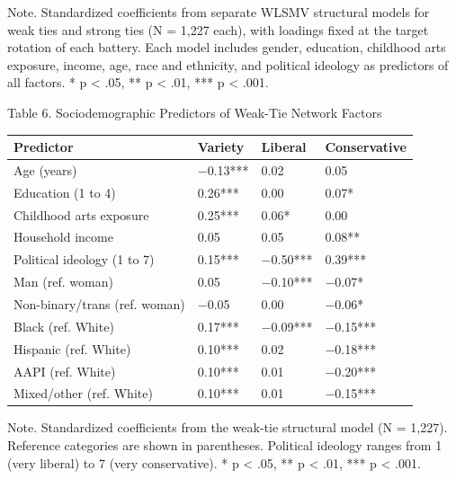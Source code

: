 \documentclass[
  12pt
]{article}
\begin{document}
Note. Standardized coefficients from separate WLSMV structural models for weak ties and strong ties (N = 1,227 each), with loadings fixed at the target rotation of each battery. Each model includes gender, education, childhood arts exposure, income, age, race and ethnicity, and political ideology as predictors of all factors. * p < .05, ** p < .01, *** p < .001.

Table 6. Sociodemographic Predictors of Weak-Tie Network Factors

\begin{tabular*}{\textwidth}{@{\extracolsep{\fill}}>{\raggedright\arraybackslash}p{} @{\hspace{1pt}}>{\raggedleft\arraybackslash}p{}@{\hspace{1pt}}>{\raggedleft\arraybackslash}p{}@{\hspace{1pt}}>{\raggedleft\arraybackslash}p{}@{}}
\toprule
Predictor & Variety & Liberal & Conservative \\
\midrule
Age (years) & $-$0.13*** & \hphantom{$-$}0.02 & \hphantom{$-$}0.05 \\
Education (1 to 4) & \hphantom{$-$}0.26*** & \hphantom{$-$}0.00 & \hphantom{$-$}0.07* \\
Childhood arts exposure & \hphantom{$-$}0.25*** & \hphantom{$-$}0.06* & \hphantom{$-$}0.00 \\
Household income & \hphantom{$-$}0.05 & \hphantom{$-$}0.05 & \hphantom{$-$}0.08** \\
Political ideology (1 to 7) & \hphantom{$-$}0.15*** & $-$0.50*** & \hphantom{$-$}0.39*** \\
Man (ref. woman) & \hphantom{$-$}0.05 & $-$0.10*** & $-$0.07* \\
Non-binary/trans (ref. woman) & $-$0.05 & \hphantom{$-$}0.00 & $-$0.06* \\
Black (ref. White) & \hphantom{$-$}0.17*** & $-$0.09*** & $-$0.15*** \\
Hispanic (ref. White) & \hphantom{$-$}0.10*** & \hphantom{$-$}0.02 & $-$0.18*** \\
AAPI (ref. White) & \hphantom{$-$}0.10*** & \hphantom{$-$}0.01 & $-$0.20*** \\
Mixed/other (ref. White) & \hphantom{$-$}0.10*** & \hphantom{$-$}0.01 & $-$0.15*** \\
\bottomrule
\end{tabular*}

Note. Standardized coefficients from the weak-tie structural model (N = 1,227). Reference categories are shown in parentheses. Political ideology ranges from 1 (very liberal) to 7 (very conservative). * p < .05, ** p < .01, *** p < .001.
\end{document}
